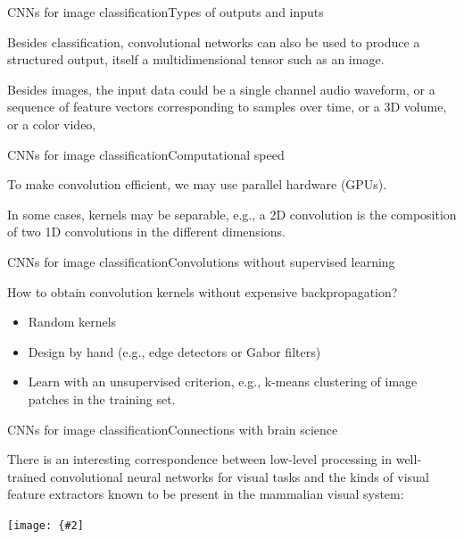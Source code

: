 \documentclass{beamer}
\newcommand{\myfig}[3]{\centerline{\texttt{[image: \{\#2]}}}
\begin{document}
\begin{frame}{CNNs for image classification}{Types of outputs and inputs}

  Besides classification, convolutional networks can also be used to
  produce a \alert{structured} output, itself a multidimensional
  tensor such as an image.

  \medskip
  
  Besides images, the input data could be a single channel audio
  waveform, or a sequence of feature vectors corresponding to samples
  over time, or a 3D volume, or a color video,

\end{frame}


\begin{frame}{CNNs for image classification}{Computational speed}

  To make convolution efficient, we may use \alert{parallel hardware}
  (GPUs).

  \medskip

  In some cases, kernels may be \alert{separable}, e.g., a 2D
  convolution is the composition of two 1D convolutions in the
  different dimensions.

\end{frame}


\begin{frame}{CNNs for image classification}{Convolutions without supervised learning}

  How to obtain convolution kernels without expensive backpropagation?
  \begin{itemize}
  \item Random kernels
  \item Design by hand (e.g., edge detectors or Gabor filters)
  \item Learn with an unsupervised criterion, e.g., k-means clustering of
   image patches in the training set.
  \end{itemize}

\end{frame}


\begin{frame}{CNNs for image classification}{Connections with brain science}

  There is an interesting correspondence between low-level processing
  in well-trained convolutional neural networks for visual tasks and
  the kinds of visual feature extractors known to be present in the
  mammalian visual system:

  \myfig{3in}{goodfellow-fig9-19}{Goodfellow et al. (2016), Figure 9.19}

\end{frame}
\end{document}
